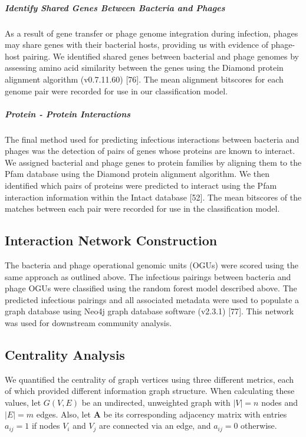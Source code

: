 \documentclass[12pt,]{article}
\let\oldsubparagraph\subparagraph
\renewcommand{\subparagraph}[1]{\oldsubparagraph{#1}\mbox{}}
\begin{document}
\subparagraph{Identify Shared Genes Between Bacteria and
Phages}\label{identify-shared-genes-between-bacteria-and-phages}

As a result of gene transfer or phage genome integration during
infection, phages may share genes with their bacterial hosts, providing
us with evidence of phage-host pairing. We identified shared genes
between bacterial and phage genomes by assessing amino acid similarity
between the genes using the Diamond protein alignment algorithm
(v0.7.11.60) {[}76{]}. The mean alignment bitscores for each genome pair
were recorded for use in our classification model.

\subparagraph{Protein - Protein
Interactions}\label{protein---protein-interactions}

The final method used for predicting infectious interactions between
bacteria and phages was the detection of pairs of genes whose proteins
are known to interact. We assigned bacterial and phage genes to protein
families by aligning them to the Pfam database using the Diamond protein
alignment algorithm. We then identified which pairs of proteins were
predicted to interact using the Pfam interaction information within the
Intact database {[}52{]}. The mean bitscores of the matches between each
pair were recorded for use in the classification model.

\subsection{Interaction Network
Construction}\label{interaction-network-construction}

The bacteria and phage operational genomic units (OGUs) were scored
using the same approach as outlined above. The infectious pairings
between bacteria and phage OGUs were classified using the random forest
model described above. The predicted infectious pairings and all
associated metadata were used to populate a graph database using Neo4j
graph database software (v2.3.1) {[}77{]}. This network was used for
downstream community analysis.

\subsection{Centrality Analysis}\label{centrality-analysis}

We quantified the centrality of graph vertices using three different
metrics, each of which provided different information graph structure.
When calculating these values, let \(G(V,E)\) be an undirected,
unweighted graph with \(|V|=n\) nodes and \(|E|=m\) edges. Also, let
\(\mathbf{A}\) be its corresponding adjacency matrix with entries
\(a_{ij} = 1\) if nodes \(V_i\) and \(V_j\) are connected via an edge,
and \(a_{ij} = 0\) otherwise.
\end{document}
